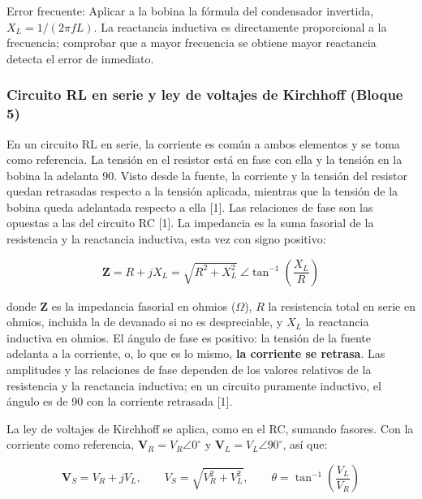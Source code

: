 \documentclass[11pt,letterpaper]{article}
\begin{document}
\begin{nota}{Error frecuente:}
Aplicar a la bobina la fórmula del condensador invertida, $X_L = 1/(2\pi f L)$. La reactancia inductiva es directamente proporcional a la frecuencia; comprobar que a mayor frecuencia se obtiene mayor reactancia detecta el error de inmediato.
\end{nota}

\subsubsection{Circuito RL en serie y ley de voltajes de Kirchhoff (Bloque 5)}

En un circuito RL en serie, la corriente es común a ambos elementos y se toma como referencia. La tensión en el resistor está en fase con ella y la tensión en la bobina la adelanta 90\textdegree{}. Visto desde la fuente, la corriente y la tensión del resistor quedan retrasadas respecto a la tensión aplicada, mientras que la tensión de la bobina queda adelantada respecto a ella [1]. Las relaciones de fase son las opuestas a las del circuito RC [1]. La impedancia es la suma fasorial de la resistencia y la reactancia inductiva, esta vez con signo positivo:

\begin{equation}
  \mathbf{Z} = R + jX_L = \sqrt{R^{2} + X_L^{2}}\ \angle \tan^{-1}\!\left(\frac{X_L}{R}\right)
\end{equation}

donde $\mathbf{Z}$ es la impedancia fasorial en ohmios (\ensuremath{\Omega}), $R$ la resistencia total en serie en ohmios, incluida la de devanado si no es despreciable, y $X_L$ la reactancia inductiva en ohmios. El ángulo de fase es positivo: la tensión de la fuente adelanta a la corriente, o, lo que es lo mismo, \textbf{la corriente se retrasa}. Las amplitudes y las relaciones de fase dependen de los valores relativos de la resistencia y la reactancia inductiva; en un circuito puramente inductivo, el ángulo es de 90\textdegree{} con la corriente retrasada [1].

La ley de voltajes de Kirchhoff se aplica, como en el RC, sumando fasores. Con la corriente como referencia, $\mathbf{V}_R = V_R \angle 0^\circ$ y $\mathbf{V}_L = V_L \angle 90^\circ$, así que:

\begin{equation}
  \mathbf{V}_S = V_R + jV_L, \qquad V_S = \sqrt{V_R^{2} + V_L^{2}}, \qquad \theta = \tan^{-1}\!\left(\frac{V_L}{V_R}\right)
\end{equation}
\end{document}
